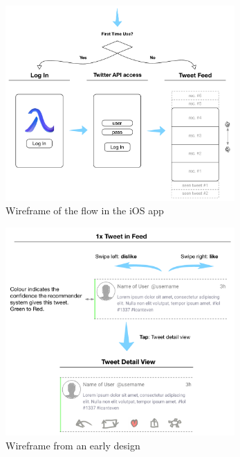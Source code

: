 \documentclass{article}
\begin{document}
\newpage


\begin{figure}[H]
    \centering
    \includegraphics[width=0.78\textwidth]{ios_wireframe_1}  
    \caption{Wireframe of the flow in the iOS app}
\end{figure}

\begin{figure}[H]
    \centering
    \includegraphics[width=0.78\textwidth]{ios_wireframe_2}  
    \caption{Wireframe from an early design}
\end{figure}


\newpage
\end{document}
